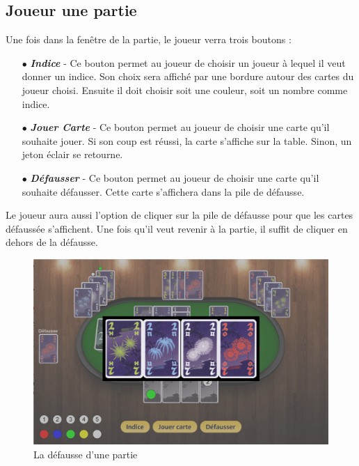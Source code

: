 \documentclass[11pt, letterpaper]{article}
\begin{document}
\subsection{Joueur une partie}

\noindent Une fois dans la fenêtre de la partie, le joueur verra trois boutons :\\

\begin{itemize}
    \item[$\bullet$] \textbf{\textit{Indice}} - Ce bouton permet au joueur de choisir un joueur à lequel il veut donner un indice. Son choix sera affiché par une bordure autour des cartes du joueur choisi. Ensuite il doit choisir soit une couleur, soit un nombre comme indice.\\
    \item[$\bullet$] \textbf{\textit{Jouer Carte}} - Ce bouton permet au joueur de choisir une carte qu'il souhaite jouer. Si son coup est réussi, la carte s'affiche sur la table. Sinon, un jeton éclair se retourne.\\
    \item[$\bullet$] \textbf{\textit{Défausser}} - Ce bouton permet au joueur de choisir une carte qu'il souhaite défausser. Cette carte s'affichera dans la pile de défausse.\\
\end{itemize}

\noindent Le joueur aura aussi l'option de cliquer sur la pile de défausse pour que les cartes défaussée s'affichent. Une fois qu'il veut revenir à la partie, il suffit de cliquer en dehors de la défausse.

\begin{figure}[H]
\begin{center}
\includegraphics[scale = 0.5]{defausse.png}
\caption{La défausse d'une partie}
\end{center}
\end{figure}
\end{document}
